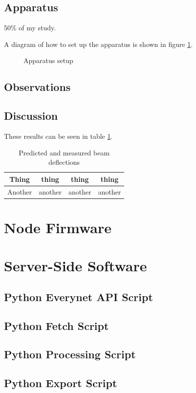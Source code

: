 \documentclass[a4paper]{report}
\begin{document}
  \section{Apparatus}
  \label{app}

  	50\% of my study.

      A diagram of how to set up the apparatus is shown in figure \ref{fig:app}.

      \begin{figure}
      \centering
      \caption{Apparatus setup}
      \label{fig:app}
      \end{figure}

  \section{Observations}


  \section{Discussion}

      These results can be seen in table \ref{fig:myt}.

      \begin{table}
      \begin{center}
      \caption{Predicted and measured beam deflections}
      \label{fig:myt}
      \begin{tabular}{|c|c|c|c|}
  	\hline
  	Thing & thing & thing & thing \\
  	\hline
  	Another & another & another & another \\
  	\hline
      \end{tabular}
      \end{center}

      \end{table}





\appendix
\chapter{Node Firmware} \label{ap:nodefirmware}

\chapter{Server-Side Software}
  \section{Python Everynet API Script} \label{ap:servereverynet}
  \section{Python Fetch Script} \label{ap:serverfetch}
  \section{Python Processing Script} \label{ap:serverprocess}
  \section{Python Export Script} \label{ap:serverexport}
\end{document}

